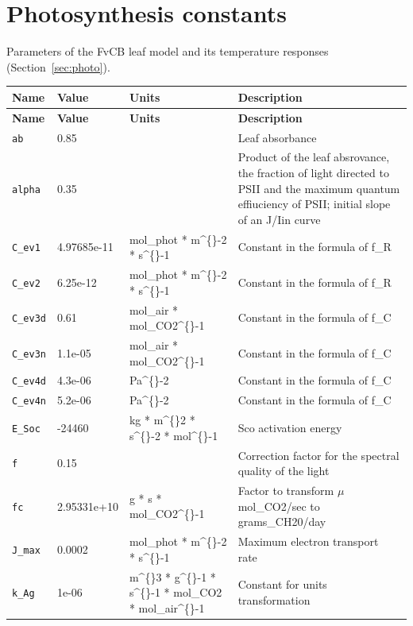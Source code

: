 \documentclass[11pt,a4paper]{article}
\begin{document}
\section{Photosynthesis constants}\label{app:photo}
Parameters of the FvCB leaf model and its temperature responses (Section~\ref{sec:photo}).
\begin{longtable}{@{}p{} p{} p{} p{}@{}}
\toprule
\textbf{Name} & \textbf{Value} & \textbf{Units} & \textbf{Description}\\
\midrule
\endfirsthead
\toprule
\textbf{Name} & \textbf{Value} & \textbf{Units} & \textbf{Description}\\
\midrule
\endhead
\texttt{ab} & 0.85 &  & Leaf absorbance\\
\texttt{alpha} & 0.35 &  & Product of the leaf absrovance, the fraction of light directed to PSII and the maximum quantum effiuciency of PSII; initial slope of an J/Iin curve\\
\texttt{C\_ev1} & 4.97685e-11 & mol\_phot * m\textasciicircum\{\}-2 * s\textasciicircum\{\}-1 & Constant in the formula of f\_R\\
\texttt{C\_ev2} & 6.25e-12 & mol\_phot * m\textasciicircum\{\}-2 * s\textasciicircum\{\}-1 & Constant in the formula of f\_R\\
\texttt{C\_ev3d} & 0.61 & mol\_air * mol\_CO2\textasciicircum\{\}-1 & Constant in the formula of f\_C\\
\texttt{C\_ev3n} & 1.1e-05 & mol\_air * mol\_CO2\textasciicircum\{\}-1 & Constant in the formula of f\_C\\
\texttt{C\_ev4d} & 4.3e-06 & Pa\textasciicircum\{\}-2 & Constant in the formula of f\_C\\
\texttt{C\_ev4n} & 5.2e-06 & Pa\textasciicircum\{\}-2 & Constant in the formula of f\_C\\
\texttt{E\_Soc} & -24460 & kg * m\textasciicircum\{\}2 * s\textasciicircum\{\}-2 * mol\textasciicircum\{\}-1 & Sco activation energy\\
\texttt{f} & 0.15 &  & Correction factor for the spectral quality of the light\\
\texttt{fc} & 2.95331e+10 & g * s * mol\_CO2\textasciicircum\{\}-1 & Factor to transform \(\mu\)mol\_CO2/sec to grams\_CH20/day\\
\texttt{J\_max} & 0.0002 & mol\_phot * m\textasciicircum\{\}-2 * s\textasciicircum\{\}-1 & Maximum electron transport rate\\
\texttt{k\_Ag} & 1e-06 & m\textasciicircum\{\}3 * g\textasciicircum\{\}-1 * s\textasciicircum\{\}-1 * mol\_CO2 * mol\_air\textasciicircum\{\}-1 & Constant for units transformation\\

\end{longtable}
\end{document}
